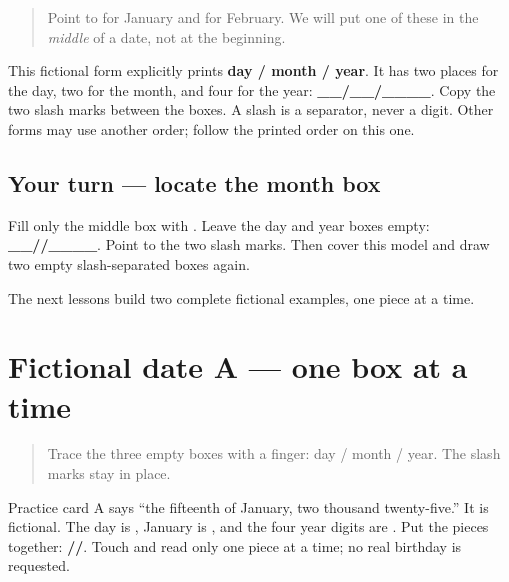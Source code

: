 \label{lesson:PA-W09-date-format}



\begin{quote}
Point to \textbf{} for January and \textbf{} for February. We will put one of these in the \emph{middle} of a date, not at the beginning.
\end{quote}

\begin{grammarlens}[title={Grammar lens — the form's printed order}]
This fictional form explicitly prints \textbf{day / month / year}. It has two places for the day, two for the month, and four for the year: \textbf{\_\_/\_\_/\_\_\_\_}. Copy the two slash marks between the boxes. A slash is a separator, never a digit. Other forms may use another order; follow the printed order on this one.
\end{grammarlens}

\subsection*{Your turn — locate the month box}
Fill only the middle box with \textbf{}. Leave the day and year boxes empty: \textbf{\_\_//\_\_\_\_}. Point to the two slash marks. Then cover this model and draw two empty slash-separated boxes again.

\begin{tcolorbox}[breakable,colback=teal!4,colframe=teal!35!black,title={Before you move on}]
The next lessons build two complete fictional examples, one piece at a time.
\end{tcolorbox}
\section[\texorpdfstring{\pa{੧੫}/\pa{੦੧}/\pa{੨੦੨੫} (fictional January date A)}{੧੫/੦੧/੨੦੨੫ (fictional January date A)}]{Fictional date A — one box at a time}

\label{lesson:PA-W09-date-a}



\begin{quote}
Trace the three empty boxes with a finger: day / month / year. The slash marks stay in place.
\end{quote}

\begin{tcolorbox}[breakable,skin=enhanced,colback=orange!6,colframe=orange!45!black,boxrule=0.5pt,arc=1mm,left=6pt,right=6pt,top=4pt,bottom=4pt,fonttitle=\bfseries,title={Read this}]
Practice card A says “the fifteenth of January, two thousand twenty-five.” It is fictional. The day is \textbf{}, January is \textbf{}, and the four year digits are \textbf{}. Put the pieces together: \textbf{//}. Touch and read only one piece at a time; no real birthday is requested.
\end{tcolorbox}

